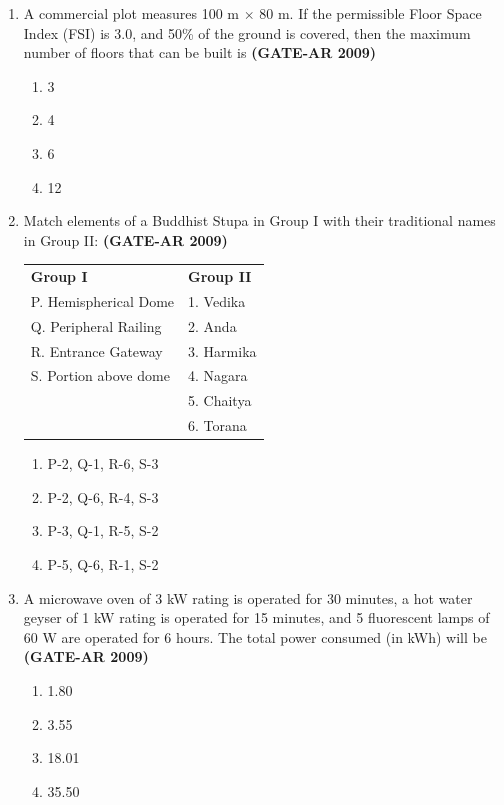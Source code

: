 \documentclass[a4paper,10pt]{article}
\begin{document}
\begin{enumerate}
    \item A commercial plot measures 100 m $\times$ 80 m. If the permissible Floor Space Index (FSI) is 3.0, and 50\% of the ground is covered, then the maximum number of floors that can be built is \hfill \textbf{(GATE-AR 2009)}
    \begin{multicols}{4}
	\begin{enumerate}
        \item 3
        \item 4
        \item 6
        \item 12
    \end{enumerate}
	\end{multicols}

    \item Match elements of a Buddhist Stupa in Group I with their traditional names in Group II: \hfill \textbf{(GATE-AR 2009)} \\
	\begin{tabular}{ l l }
	\textbf{Group I} & \textbf{Group II} \\
	P. Hemispherical Dome & 1. Vedika \\
	Q. Peripheral Railing & 2. Anda \\
	R. Entrance Gateway & 3. Harmika \\
	S. Portion above dome & 4. Nagara \\
	& 5. Chaitya \\
	& 6. Torana \\
	\end{tabular}
	\begin{multicols}{2}
	\begin{enumerate}
        \item P-2, Q-1, R-6, S-3
        \item P-2, Q-6, R-4, S-3
        \item P-3, Q-1, R-5, S-2
        \item P-5, Q-6, R-1, S-2
    \end{enumerate}
	\end{multicols}

    \item A microwave oven of 3 kW rating is operated for 30 minutes, a hot water geyser of 1 kW rating is operated for 15 minutes, and 5 fluorescent lamps of 60 W are operated for 6 hours. The total power consumed (in kWh) will be \hfill \textbf{(GATE-AR 2009)}
    \begin{multicols}{4}
	\begin{enumerate}
        \item 1.80
        \item 3.55
        \item 18.01
        \item 35.50
    \end{enumerate}
	\end{multicols}


\end{enumerate}
\end{document}
